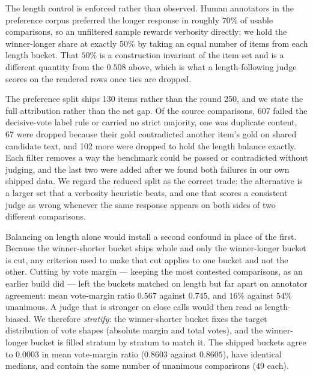 The length control is enforced rather than observed. Human annotators in the
preference corpus preferred the longer response in roughly 70\% of usable
comparisons, so an unfiltered sample rewards verbosity directly; we hold the
winner-longer share at exactly 50\% by taking an equal number of items from each
length bucket. That $50\%$ is a construction invariant of the item set and is a
different quantity from the $0.508$ above, which is what a length-following judge
scores on the rendered rows once ties are dropped.

The preference split ships 130 items rather than the round 250, and we state the
full attribution rather than the net gap. Of the source comparisons, 607 failed
the decisive-vote label rule or carried no strict majority, one was duplicate
content, 67 were dropped because their gold contradicted another item's gold on
shared candidate text, and 102 more were dropped to hold the length balance
exactly. Each filter removes a way the benchmark could be passed or contradicted
without judging, and the last two were added after we found both failures in our
own shipped data. We regard the reduced split as the correct trade: the
alternative is a larger set that a verbosity heuristic beats, and one that scores
a consistent judge as wrong whenever the same response appears on both sides of
two different comparisons.

Balancing on length alone would install a second confound in place of the first.
Because the winner-shorter bucket ships whole and only the winner-longer bucket
is cut, any criterion used to make that cut applies to one bucket and not the
other. Cutting by vote margin --- keeping the most contested comparisons, as an
earlier build did --- left the buckets matched on length but far apart on
annotator agreement: mean vote-margin ratio $0.567$ against $0.745$, and $16\%$
against $54\%$ unanimous. A judge that is stronger on close calls would then
read as length-biased. We therefore \emph{stratify}: the winner-shorter bucket
fixes the target distribution of vote shapes (absolute margin and total votes),
and the winner-longer bucket is filled stratum by stratum to match it. The
shipped buckets agree to $0.0003$ in mean vote-margin ratio ($0.8603$ against
$0.8605$), have identical medians, and contain the same number of unanimous
comparisons ($49$ each).

